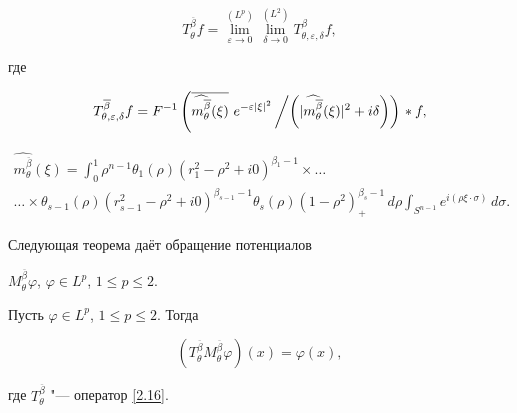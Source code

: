 \begin{equation}\label{2.16}

 T_\theta^{\overline{\beta}}f=\lim_{\varepsilon\to 0}^{(L^{p})}

 \lim_{\delta\to 0}^{(L^2)}

 T_{\theta,\varepsilon,\delta}^{\beta}f,

\end{equation}

где

\begin{equation}\label{1.10}

 T_{\theta,\varepsilon,\delta}^{\overline{\beta}}f=

 F^{-1}\left({\overline{\widehat{m_{\theta}^{\overline{\beta}}}(\xi)}\

 e^{-\varepsilon|\xi|^2}}

\left/

\left( {|\widehat{m_{\theta}^{\overline{\beta}}}(\xi)|^2+i\delta}\right)\right)\right.*f,

\end{equation}

\begin{multline*}

  \widehat{m_{\theta}^{\overline{\beta}}}(\xi)=\int _{0}^1 \rho^{n-1}

\theta_1(\rho)(r_1^2-\rho^2+i0)^{\beta_1-1}\times\ldots

\\

\ldots\times\theta_{s-1}(\rho)

(r_{s-1}^2-\rho^2+i0)^{\beta_{s-1}-1}\theta_{s}(\rho)(1-\rho^2)^{\beta_{s}-1}_+

\,d\rho \int _{S^{n-1}}

     e^{i(\rho\xi\cdot \sigma)}\,d\sigma.

\label{4.79}

\end{multline*}

Следующая теорема даёт обращение потенциалов

$M_{\theta}^{\overline{\beta}}\varphi$, $\varphi\in L^p$, $1\leq p\leq 2$.



\begin{theorem}[3]Пусть $\varphi\in L^p${\rm ,} $1\leq p\leq 2${\rm .} Тогда

    \begin{equation}\label{2.20}

        \left(T_\theta^{\overline{\beta}}

       M_\theta^{\overline{\beta}}\varphi\right)(x)=\varphi(x),

    \end{equation}

где $T_\theta^{\overline{\beta}}$ "--- оператор \eqref{2.16}.

\end{theorem}



